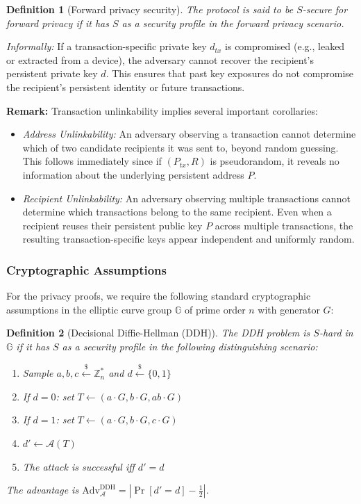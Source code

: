 \documentclass{article}
\newtheorem{definition}{Definition}[section]
\begin{document}
\begin{definition}[Forward privacy security]
The protocol is said to be $S$-secure for forward privacy if it has $S$ as a security profile in the forward privacy scenario.
\end{definition}

\textit{Informally:} If a transaction-specific private key $d_{tx}$ is compromised (e.g., leaked or extracted from a device), the adversary cannot recover the recipient's persistent private key $d$. This ensures that past key exposures do not compromise the recipient's persistent identity or future transactions.

\medskip

\noindent\textbf{Remark:} Transaction unlinkability implies several important corollaries:
\begin{itemize}
\item \emph{Address Unlinkability:} An adversary observing a transaction cannot determine which of two candidate recipients it was sent to, beyond random guessing. This follows immediately since if $(P_{tx}, R)$ is pseudorandom, it reveals no information about the underlying persistent address $P$.

\item \emph{Recipient Unlinkability:} An adversary observing multiple transactions cannot determine which transactions belong to the same recipient. Even when a recipient reuses their persistent public key $P$ across multiple transactions, the resulting transaction-specific keys appear independent and uniformly random.
\end{itemize}

\subsubsection{Cryptographic Assumptions}

For the privacy proofs, we require the following standard cryptographic assumptions in the elliptic curve group $\mathbb{G}$ of prime order $n$ with generator $G$:

\begin{definition}[Decisional Diffie-Hellman (DDH)]
The DDH problem is $S$-hard in $\mathbb{G}$ if it has $S$ as a security profile in the following distinguishing scenario:
\begin{enumerate}
\item Sample $a, b, c \stackrel{\$}{\leftarrow} \mathbb{Z}_n^*$ and $d \stackrel{\$}{\leftarrow} \{0,1\}$
\item If $d = 0$: set $T \leftarrow (a \cdot G, b \cdot G, ab \cdot G)$
\item If $d = 1$: set $T \leftarrow (a \cdot G, b \cdot G, c \cdot G)$
\item $d' \gets \mathcal{A}(T)$
\item The attack is successful iff $d' = d$
\end{enumerate}
The advantage is $\text{Adv}^{\text{DDH}}_{\mathcal{A}} = \left|\Pr[d' = d] - \frac{1}{2}\right|$.
\end{definition}
\end{document}
